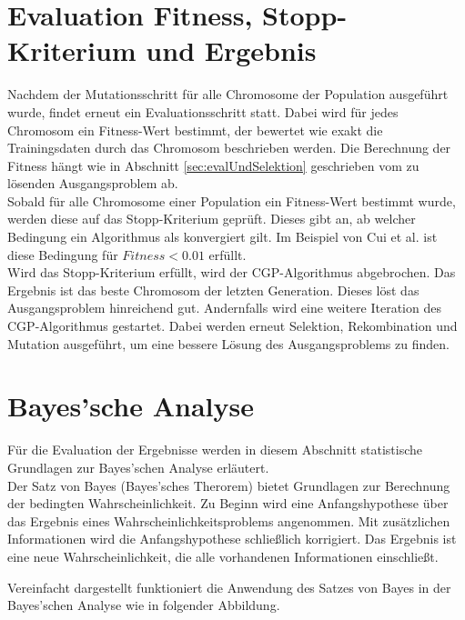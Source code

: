 \section{Evaluation Fitness, Stopp-Kriterium und Ergebnis}
\label{sec:fitness,StopKrit,Ergebnis}

Nachdem der Mutationsschritt für alle Chromosome der Population ausgeführt wurde, findet erneut ein Evaluationsschritt statt.
Dabei wird für jedes Chromosom ein Fitness-Wert bestimmt, der bewertet wie exakt die Trainingsdaten durch das Chromosom beschrieben werden. \cite{milad_taleby_ahvanooey_survey_2019}
Die Berechnung der Fitness hängt wie in Abschnitt \ref{sec:evalUndSelektion} geschrieben vom zu lösenden Ausgangsproblem ab.\\
Sobald für alle Chromosome einer Population ein Fitness-Wert bestimmt wurde, werden diese auf das Stopp-Kriterium geprüft.
Dieses gibt an, ab welcher Bedingung ein Algorithmus als konvergiert gilt.
Im Beispiel von Cui et al. ist diese Bedingung für $Fitness < 0.01$ erfüllt. \cite{affenzeller_positional_2024}\\
Wird das Stopp-Kriterium erfüllt, wird der CGP-Algorithmus abgebrochen.
Das Ergebnis ist das beste Chromosom der letzten Generation.
Dieses löst das Ausgangsproblem hinreichend gut.
Andernfalls wird eine weitere Iteration des CGP-Algorithmus gestartet. 
Dabei werden erneut Selektion, Rekombination und Mutation ausgeführt, um eine bessere Lösung des Ausgangsproblems zu finden.

\section{Bayes'sche Analyse}
\label{sec:bayesian}

Für die Evaluation der Ergebnisse werden in diesem Abschnitt statistische Grundlagen zur Bayes'schen Analyse erläutert.\\
Der Satz von Bayes (Bayes'sches Therorem) bietet Grundlagen zur Berechnung der bedingten Wahrscheinlichkeit.
Zu Beginn wird eine Anfangshypothese über das Ergebnis eines Wahrscheinlichkeitsproblems angenommen.
Mit zusätzlichen Informationen wird die Anfangshypothese schließlich korrigiert.
Das Ergebnis ist eine neue Wahrscheinlichkeit, die alle vorhandenen Informationen einschließt. \cite{peyrolon_definition_2020}

Vereinfacht dargestellt funktioniert die Anwendung des Satzes von Bayes in der Bayes'schen Analyse wie in folgender Abbildung.

